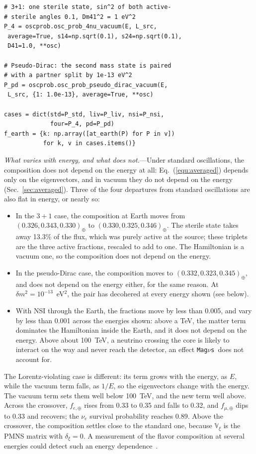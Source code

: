 \documentclass[final,5p,times,twocolumn,sort,compress]{elsarticle}
\makeatletter
\newcommand{\eq}{Eq.}
\DeclareRobustCommand{\_}{%
  \ifmmode\nfss@text{\textunderscore}\else\textunderscore\allowbreak\fi}
\newcommand{\equ}[1]{\eq~(\ref{equ:#1})}
\newcommand{\magnus}{{\tt Mag}\ensuremath{\nu}{\tt s}}
\makeatother
\begin{document}
\begin{lstlisting}
# 3+1: one sterile state, sin^2 of both active-
# sterile angles 0.1, Dm41^2 = 1 eV^2
P_4 = oscprob.osc_prob_4nu_vacuum(E, L_src,
 average=True, s14=np.sqrt(0.1), s24=np.sqrt(0.1),
 D41=1.0, **osc)

# Pseudo-Dirac: the second mass state is paired
# with a partner split by 1e-13 eV^2
P_pd = oscprob.osc_prob_pseudo_dirac_vacuum(E,
 L_src, {1: 1.0e-13}, average=True, **osc)

cases = dict(std=P_std, liv=P_liv, nsi=P_nsi,
             four=P_4, pd=P_pd)
f_earth = {k: np.array([at_earth(P) for P in v])
           for k, v in cases.items()}
\end{lstlisting}

\textit{What varies with energy, and what does not.}---Under standard oscillations, the composition does not depend on the energy at all: \equ{averaged} depends only on the eigenvectors, and in vacuum they do not depend on the energy (Sec.~\ref{sec:averaged}). Three of the four departures from standard oscillations are also flat in energy, or nearly so:
\begin{itemize}
 \item
  In the $3+1$ case, the composition at Earth moves from $(0.326, 0.343, 0.330)_\oplus$ to $(0.330, 0.325, 0.346)_\oplus$. The sterile state takes away 13.3\% of the flux, which was purely active at the source; these triplets are the three active fractions, rescaled to add to one. The Hamiltonian is a vacuum one, so the composition does not depend on the energy.
 \item
  In the pseudo-Dirac case, the composition moves to $(0.332, 0.323, 0.345)_\oplus$, and does not depend on the energy either, for the same reason. At $\delta m^2 = 10^{-13}$~eV$^2$, the pair has decohered at every energy shown (see below).
 \item
  With NSI through the Earth, the fractions move by less than 0.005, and vary by less than 0.001 across the energies shown: above a TeV, the matter term dominates the Hamiltonian inside the Earth, and it does not depend on the energy. Above about 100~TeV, a neutrino crossing the core is likely to interact on the way and never reach the detector, an effect \magnus\ does not account for.
\end{itemize}

The Lorentz-violating case is different: its term grows with the energy, as $E$, while the vacuum term falls, as $1/E$, so the eigenvectors change with the energy. The vacuum term sets them well below 100~TeV, and the new term well above. Across the crossover, $f_{e, \oplus}$ rises from 0.33 to 0.35 and falls to 0.32, and $f_{\mu, \oplus}$ dips to 0.33 and recovers; the $\nu_e$ survival probability reaches 0.89. Above the crossover, the composition settles close to the standard one, because $\mathbb{V}_\xi$ is the PMNS matrix with $\delta_\xi = 0$. A measurement of the flavor composition at several energies could detect such an energy dependence\ \cite{Liu:2023flr, Telalovic:2025xor}.
\end{document}
